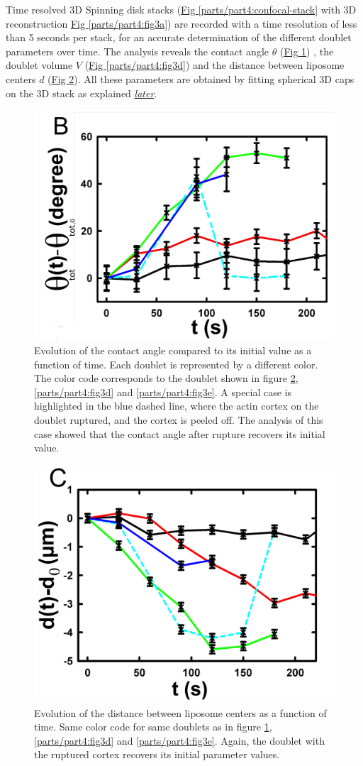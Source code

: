 \documentclass[A4paperpaper,11pt,english]{sphinxmanual}
\begin{document}
Time resolved 3D Spinning disk stacks (\hyperref[parts/part4:confocal-stack]{Fig  \ref*{parts/part4:confocal-stack}} with 3D reconstruction
\hyperref[parts/part4:fig3a]{Fig  \ref*{parts/part4:fig3a}}) are recorded with a time resolution of less than 5 seconds per stack, for an accurate determination of the different
doublet parameters over time. The analysis reveals the contact angle \(\theta\) (\hyperref[parts/part4:fig3b]{Fig  \ref*{parts/part4:fig3b}}) , the
doublet volume \(V\) (\hyperref[parts/part4:fig3d]{Fig  \ref*{parts/part4:fig3d}}) and the distance between liposome
centers \(d\) (\hyperref[parts/part4:fig3c]{Fig  \ref*{parts/part4:fig3c}}). All these parameters are obtained by
fitting spherical 3D caps on the 3D stack as explained {\hyperref[parts/part4:full3dfit]{\emph{later}}}.
\begin{figure}[htbp]
\centering
\capstart

\includegraphics[width=0.500\linewidth]{Fig_03-B.png}
\caption{Evolution of the contact angle compared to its initial value as a function of
time.  Each doublet is represented by a different color. The color code corresponds to the doublet
shown in figure \hyperref[parts/part4:fig3c]{ \ref*{parts/part4:fig3c}}, \hyperref[parts/part4:fig3d]{ \ref*{parts/part4:fig3d}}
and \hyperref[parts/part4:fig3e]{ \ref*{parts/part4:fig3e}}. A special case is highlighted in the blue dashed line,
where the actin cortex on the doublet ruptured, and the cortex is peeled off.
The analysis of this case showed that the contact angle after rupture recovers its initial value.}\label{parts/part4:fig3b}\end{figure}
\begin{figure}[htbp]
\centering
\capstart

\includegraphics[width=0.500\linewidth]{Fig_03-C.png}
\caption{Evolution of the distance between liposome centers as a function of time.
Same color code for same doublets as in figure \hyperref[parts/part4:fig3b]{ \ref*{parts/part4:fig3b}}, \hyperref[parts/part4:fig3d]{ \ref*{parts/part4:fig3d}}
and \hyperref[parts/part4:fig3e]{ \ref*{parts/part4:fig3e}}. Again, the doublet with the ruptured cortex recovers its initial parameter values.}\label{parts/part4:fig3c}\end{figure}
\end{document}

